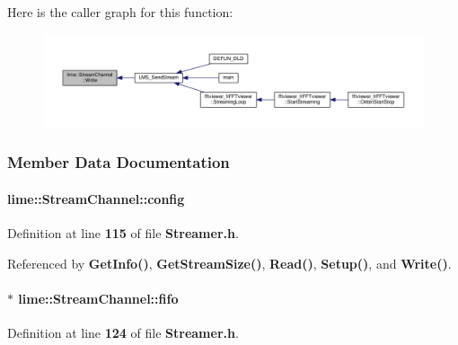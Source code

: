 Here is the caller graph for this function\+:
\nopagebreak
\begin{figure}[H]
\begin{center}
\leavevmode
\includegraphics[width=350pt]{d7/db1/classlime_1_1StreamChannel_a7c8c7d8be9b371665a23482b8b713480_icgraph}
\end{center}
\end{figure}




\subsubsection{Member Data Documentation}
\paragraph[{config}]{ lime\+::\+Stream\+Channel\+::config}\label{classlime_1_1StreamChannel_a4b29b8f3a032d5587df92caf08125d73}


Definition at line {\bf 115} of file {\bf Streamer.\+h}.



Referenced by {\bf Get\+Info()}, {\bf Get\+Stream\+Size()}, {\bf Read()}, {\bf Setup()}, and {\bf Write()}.

\paragraph[{fifo}]{$\ast$ lime\+::\+Stream\+Channel\+::fifo\hspace{0.3cm}{\ttfamily [protected]}}\label{classlime_1_1StreamChannel_a9a825226b323419a4bab9bd49a05bc1d}


Definition at line {\bf 124} of file {\bf Streamer.\+h}.




